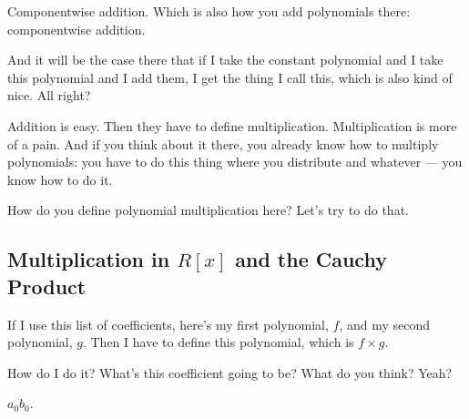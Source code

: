 \begin{speech}[01:26:30 - 01:27:08]
Componentwise addition. Which is also how you add polynomials there: componentwise addition.

And it will be the case there that if I take the constant polynomial and I take this polynomial and I add them,  I get the thing I call this, which is also kind of nice. All right?

Addition is easy. Then they have to define multiplication. Multiplication is more of a pain. And if you think about it there, you already know how to multiply polynomials: you have to do this thing where you distribute and whatever --- you know how to do it.

How do you define polynomial multiplication here? Let's try to do that.
\end{speech}

\subsection{Multiplication in \texorpdfstring{$R[x]$}{R[x]} and the Cauchy Product}

\begin{speech}[01:27:08 - 01:27:43]
If I use this list of coefficients, here's my first polynomial, $f$,  and my second polynomial, $g$.  Then I have to define this polynomial, which is $f \times g$. 

How do I do it? What's this coefficient going to be? What do you think? Yeah?
\end{speech}

\begin{student}
$a_0 b_0$.
\end{student}


